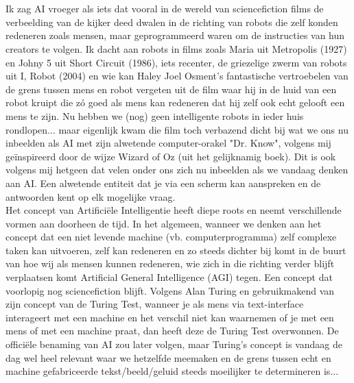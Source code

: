 
\chapter*{}%
\label{ch:voorwoord}


Ik zag AI vroeger als iets dat vooral in de wereld van sciencefiction films de verbeelding van de kijker deed dwalen in de richting van robots die zelf konden redeneren zoals mensen, maar geprogrammeerd waren om de instructies van hun creators te volgen. Ik dacht aan robots in films zoals Maria uit Metropolis (1927) en Johny 5 uit Short Circuit (1986), iets recenter, de griezelige zwerm van robots uit I, Robot (2004) en wie kan Haley Joel Osment's fantastische vertroebelen van de grens tussen mens en robot vergeten uit de film \textcite{A.I.2001} waar hij in de huid van een robot kruipt die zó goed als mens kan redeneren dat hij zelf ook echt gelooft een mens te zijn. Nu hebben we (nog) geen intelligente robots in ieder huis rondlopen... maar eigenlijk kwam die film toch verbazend dicht bij wat we ons nu inbeelden als AI met zijn alwetende computer-orakel "Dr. Know", volgens mij geïnspireerd door de wijze Wizard of Oz (uit het gelijknamig boek). Dit is ook volgens mij  hetgeen dat velen onder ons zich nu inbeelden als we vandaag denken aan AI. Een alwetende entiteit dat je via een scherm kan aanspreken en de antwoorden kent op elk mogelijke vraag. \\

Het concept van Artificiële Intelligentie heeft diepe roots en neemt verschillende vormen aan doorheen de tijd. In het algemeen, wanneer we denken aan het concept dat een niet levende machine (vb. computerprogramma) zelf complexe taken kan uitvoeren, zelf kan redeneren en zo steeds dichter bij komt in de buurt van hoe wij als mensen kunnen redeneren, wie zich in die richting verder blijft verplaatsen komt Artificial General Intelligence (AGI) tegen. Een concept dat voorlopig nog sciencefiction blijft. Volgens Alan Turing en gebruikmakend van zijn concept van de Turing Test, wanneer je als mens via text-interface interageert met een machine en het verschil niet kan waarnemen of je met een mens of met een machine praat, dan heeft deze de Turing Test overwonnen. De officiële benaming van AI zou later volgen, maar Turing's concept is vandaag de dag wel heel relevant waar we hetzelfde meemaken en de grens tussen echt en machine gefabriceerde tekst/beeld/geluid steeds moeilijker te determineren is... \\

